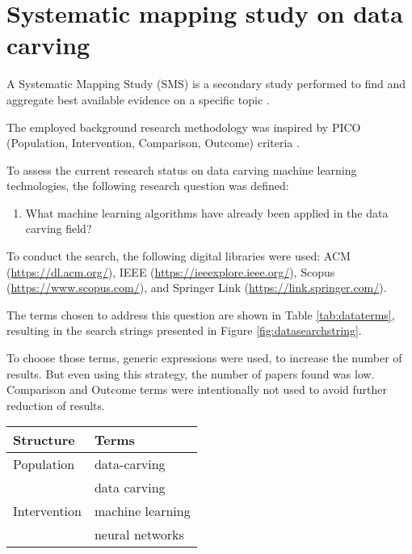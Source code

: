 \section{Systematic mapping study on data carving}
\label{sec:data-carving-sms}

A Systematic Mapping Study (SMS) is a secondary study performed to 
find and aggregate best available evidence on a specific topic \cite{petersen_systematic_2008}.

The employed background research methodology was inspired by PICO (Population, Intervention, Comparison, Outcome) criteria \cite{kitchenham_guidelines_2007}.

To assess the current research status on data carving machine learning technologies, the following research question was defined:

\begin{enumerate}[itemindent=\parindent,label=\textbf{RQ\arabic*.}]
    \item What machine learning algorithms have already been applied in the data carving field?
\end{enumerate}

To conduct the search, the following digital libraries were used: 
ACM (\url{https://dl.acm.org/}),
IEEE (\url{https://ieeexplore.ieee.org/}),
Scopus (\url{https://www.scopus.com/}),
and
Springer Link (\url{https://link.springer.com/}).

The terms chosen to address this question are shown in Table \ref{tab:dataterms}, resulting in the search strings presented in  Figure \ref{fig:datasearchstring}.

To choose those terms, generic expressions were used, to increase the number of results. But even using this strategy, the number of papers found was low. Comparison and Outcome terms were intentionally not used to avoid further reduction of results.

\begin{table*}[!ht]
    \centering
    \caption{Terms used}
    \label{tab:dataterms}
    \begin{tabular}{ l  l }
      Structure 	& Terms 		\\
      \hline\hline
      Population 	& data-carving \\   
                    & data carving \\
      \hline
      Intervention 	& machine learning \\
                    & neural networks \\
      \hline
    \end{tabular}
\end{table*}

